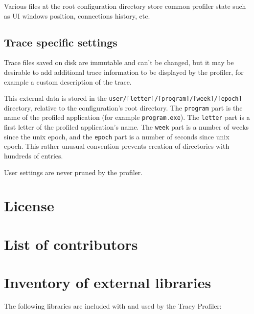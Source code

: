 \documentclass[hidelinks,titlepage,a4paper]{article}
\begin{document}
Various files at the root configuration directory store common profiler state such as UI windows position, connections history, etc.

\subsection{Trace specific settings}

Trace files saved on disk are immutable and can't be changed, but it may be desirable to add additional trace information to be displayed by the profiler, for example a custom description of the trace.

This external data is stored in the \texttt{user/[letter]/[program]/[week]/[epoch]} directory, relative to the configuration's root directory. The \texttt{program} part is the name of the profiled application (for example \texttt{program.exe}). The \texttt{letter} part is a first letter of the profiled application's name. The \texttt{week} part is a number of weeks since the unix epoch, and the \texttt{epoch} part is a number of seconds since unix epoch. This rather unusual convention prevents creation of directories with hundreds of entries.

User settings are never pruned by the profiler.

\newpage
\appendix
\appendixpage

\section{License}



\section{List of contributors}



\section{Inventory of external libraries}

The following libraries are included with and used by the Tracy Profiler:
\end{document}
